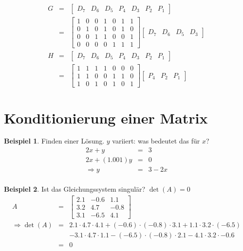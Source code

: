 \documentclass[11pt]{article} %
\theoremstyle{definition}
\newtheorem*{beispiel}{Beispiel}
\begin{document}
\begin{eqnarray*}
G &=& \begin{bmatrix}
	D_7 & D_6 & D_5 & P_4 & D_3 & P_2 & P_1
\end{bmatrix} \\
&=& \begin{bmatrix}
1 & 0 & 0 & 1 & 0 & 1 & 1 \\
0 & 1 & 0 & 1 & 0 & 1 & 0\\
0 & 0 & 1 & 1 & 0 & 0 & 1\\
0 & 0 & 0 & 0 & 1 & 1 & 1
\end{bmatrix} \begin{bmatrix}
 D_7 & D_6 & D_5 & D_3
\end{bmatrix} \\
H &=& \begin{bmatrix}
D_7 & D_6 & D_5 & P_4 & D_3 & P_2 & P_1
\end{bmatrix} \\
&=& \begin{bmatrix}
1 & 1 & 1 & 1 & 0 & 0 & 0\\
1 & 1 & 0 & 0 & 1 & 1 & 0\\
1 & 0 & 1 & 0 & 1 & 0 & 1
\end{bmatrix} \begin{bmatrix} P_4 & P_2 & P_1 \end{bmatrix}
\end{eqnarray*}

\section{Konditionierung einer Matrix}

\begin{beispiel} Finden einer Lösung. $y$ variiert: was bedeutet das für $x$?
\begin{eqnarray*}
2x + y &=& 3 \\
2x + (1.001)y &=& 0 \\
\Rightarrow y &=& 3 - 2x \\
\end{eqnarray*}
\end{beispiel}

\begin{beispiel} Ist das Gleichungssystem singulär? $\det (A) = 0$
\begin{eqnarray*}
A &=& \begin{bmatrix}
2.1 & -0.6 & 1.1 \\
3.2 & 4.7 & -0.8 \\
3.1 & -6.5 & 4.1
\end{bmatrix} \\
\Rightarrow \det (A) &=& 2.1\cdot 4.7 \cdot 4.1 + (-0.6)\cdot (-0.8) \cdot 3.1 + 1.1\cdot 3.2 \cdot (-6.5)
\\ && -3.1\cdot 4.7 \cdot 1.1 - (-6.5)\cdot (-0.8) \cdot 2.1 - 4.1 \cdot 3.2 \cdot -0.6 \\
&=& 0
\end{eqnarray*}
\end{beispiel}
\end{document}
